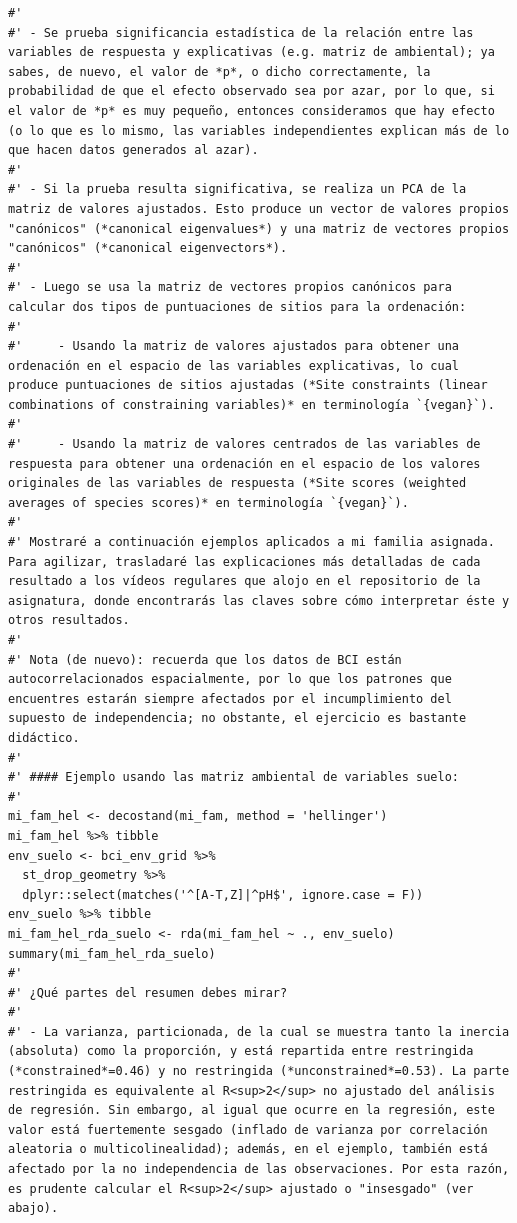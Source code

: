 \documentclass[11pt,]{article}
\begin{document}
\begin{verbatim}
#' 
#' - Se prueba significancia estadística de la relación entre las variables de respuesta y explicativas (e.g. matriz de ambiental); ya sabes, de nuevo, el valor de *p*, o dicho correctamente, la probabilidad de que el efecto observado sea por azar, por lo que, si el valor de *p* es muy pequeño, entonces consideramos que hay efecto (o lo que es lo mismo, las variables independientes explican más de lo que hacen datos generados al azar).
#' 
#' - Si la prueba resulta significativa, se realiza un PCA de la matriz de valores ajustados. Esto produce un vector de valores propios "canónicos" (*canonical eigenvalues*) y una matriz de vectores propios "canónicos" (*canonical eigenvectors*).
#' 
#' - Luego se usa la matriz de vectores propios canónicos para calcular dos tipos de puntuaciones de sitios para la ordenación:
#' 
#'     - Usando la matriz de valores ajustados para obtener una ordenación en el espacio de las variables explicativas, lo cual produce puntuaciones de sitios ajustadas (*Site constraints (linear combinations of constraining variables)* en terminología `{vegan}`).
#'     
#'     - Usando la matriz de valores centrados de las variables de respuesta para obtener una ordenación en el espacio de los valores originales de las variables de respuesta (*Site scores (weighted averages of species scores)* en terminología `{vegan}`).
#' 
#' Mostraré a continuación ejemplos aplicados a mi familia asignada. Para agilizar, trasladaré las explicaciones más detalladas de cada resultado a los vídeos regulares que alojo en el repositorio de la asignatura, donde encontrarás las claves sobre cómo interpretar éste y otros resultados.
#' 
#' Nota (de nuevo): recuerda que los datos de BCI están autocorrelacionados espacialmente, por lo que los patrones que encuentres estarán siempre afectados por el incumplimiento del supuesto de independencia; no obstante, el ejercicio es bastante didáctico.
#' 
#' #### Ejemplo usando las matriz ambiental de variables suelo:
#' 
mi_fam_hel <- decostand(mi_fam, method = 'hellinger')
mi_fam_hel %>% tibble
env_suelo <- bci_env_grid %>%
  st_drop_geometry %>%
  dplyr::select(matches('^[A-T,Z]|^pH$', ignore.case = F))
env_suelo %>% tibble
mi_fam_hel_rda_suelo <- rda(mi_fam_hel ~ ., env_suelo)
summary(mi_fam_hel_rda_suelo)
#' 
#' ¿Qué partes del resumen debes mirar?
#' 
#' - La varianza, particionada, de la cual se muestra tanto la inercia (absoluta) como la proporción, y está repartida entre restringida (*constrained*=0.46) y no restringida (*unconstrained*=0.53). La parte restringida es equivalente al R<sup>2</sup> no ajustado del análisis de regresión. Sin embargo, al igual que ocurre en la regresión, este valor está fuertemente sesgado (inflado de varianza por correlación aleatoria o multicolinealidad); además, en el ejemplo, también está afectado por la no independencia de las observaciones. Por esta razón, es prudente calcular el R<sup>2</sup> ajustado o "insesgado" (ver abajo).

\end{verbatim}
\end{document}
